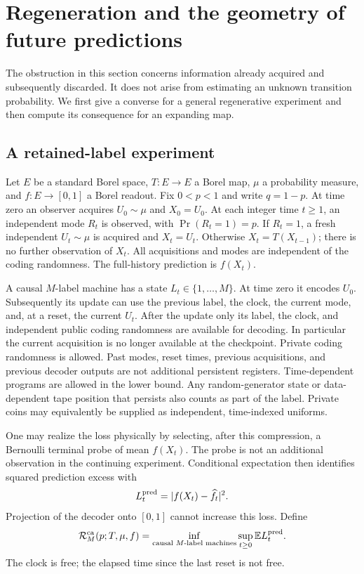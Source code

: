 \section{Regeneration and the geometry of future predictions}
\label{sec:v3-regeneration}
The obstruction in this section concerns information already acquired and
subsequently discarded. It does not arise from estimating an unknown
transition probability. We first give a converse for a general regenerative
experiment and then compute its consequence for an expanding map.

\subsection{A retained-label experiment}
Let $E$ be a standard Borel space, $T:E\to E$ a Borel map, $\mu$ a
probability measure, and $f:E\to[0,1]$ a Borel readout. Fix $0<p<1$ and
write $q=1-p$. At time zero an observer acquires $U_0\sim\mu$ and
$X_0=U_0$. At each integer time $t\ge1$, an independent mode $R_t$ is
observed, with $\Pr(R_t=1)=p$. If $R_t=1$, a fresh independent
$U_t\sim\mu$ is acquired and $X_t=U_t$. Otherwise $X_t=T(X_{t-1})$;
there is no further observation of $X_t$. All acquisitions and modes are
independent of the coding randomness. The full-history prediction is
$f(X_t)$.

A causal $M$-label machine has a state $L_t\in\{1,\ldots,M\}$.
At time zero it encodes $U_0$. Subsequently its update can use the previous
label, the clock, the current mode, and, at a reset, the current $U_t$.
After the update only its label, the clock, and independent public coding
randomness are available for decoding. In particular the current
acquisition is no longer available at the checkpoint. Private coding
randomness is allowed. Past modes, reset times, previous acquisitions, and
previous decoder outputs are not additional persistent registers.
Time-dependent programs are allowed in the lower bound.
Any random-generator state or data-dependent tape position that persists
also counts as part of the label. Private coins may equivalently be
supplied as independent, time-indexed uniforms.

One may realize the loss physically by selecting, after this compression,
a Bernoulli terminal probe of mean $f(X_t)$. The probe is not an additional
observation in the continuing experiment. Conditional expectation then
identifies squared prediction excess with
\[
 L_t^{\rm pred}=|f(X_t)-\widehat f_t|^2.
\]
Projection of the decoder onto $[0,1]$ cannot increase this loss. Define
\[
 \mathcal R_M^{\rm ca}(p;T,\mu,f)
   =\inf_{\text{causal $M$-label machines}}
      \sup_{t\ge0}\mathbb E L_t^{\rm pred}.
\]
The clock is free; the elapsed time since the last reset is not free.

